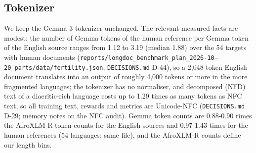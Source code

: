 \subsection{Tokenizer}\label{tokenizer}

We keep the Gemma 3 tokenizer unchanged. The relevant measured facts are modest: the number of Gemma tokens of the human reference per Gemma token of the English source ranges from 1.12 to 3.19 (median 1.88) over the 54 targets with human documents (\texttt{reports/longdoc\_benchmark\_plan\_2026-10-20\_parts/data/fertility.json}, \texttt{DECISIONS.md} D-44), so a 2,048-token English document translates into an output of roughly 4,000 tokens or more in the more fragmented languages; the tokenizer has no normaliser, and decomposed (NFD) text of a diacritic-rich language costs up to 1.29 times as many tokens as NFC text, so all training text, rewards and metrics are Unicode-NFC (\texttt{DECISIONS.md} D-29; memory notes on the NFC audit). Gemma token counts are 0.88-0.90 times the AfroXLM-R token counts for the English sources and 0.97-1.43 times for the human references (54 languages; same file), and the AfroXLM-R counts define our length bins.

